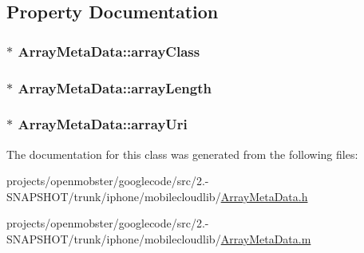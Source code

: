 \subsection{\-Property \-Documentation}
\hypertarget{interface_array_meta_data_adc0bd99d0f5b34b67b312779a298f294}{
\subsubsection[{array\-Class}]{ $\ast$ \-Array\-Meta\-Data\-::array\-Class}}
\label{interface_array_meta_data_adc0bd99d0f5b34b67b312779a298f294}
\hypertarget{interface_array_meta_data_a450df0dafccdb9905bc4164e91129026}{
\subsubsection[{array\-Length}]{ $\ast$ \-Array\-Meta\-Data\-::array\-Length}}
\label{interface_array_meta_data_a450df0dafccdb9905bc4164e91129026}
\hypertarget{interface_array_meta_data_a860a557b87e0c559db7fd7c840409cee}{
\subsubsection[{array\-Uri}]{ $\ast$ \-Array\-Meta\-Data\-::array\-Uri}}
\label{interface_array_meta_data_a860a557b87e0c559db7fd7c840409cee}


\-The documentation for this class was generated from the following files\-:\begin{DoxyCompactItemize}
\item 
projects/openmobster/googlecode/src/2.-\/\-S\-N\-A\-P\-S\-H\-O\-T/trunk/iphone/mobilecloudlib/\hyperlink{_array_meta_data_8h}{\-Array\-Meta\-Data.\-h}\item 
projects/openmobster/googlecode/src/2.-\/\-S\-N\-A\-P\-S\-H\-O\-T/trunk/iphone/mobilecloudlib/\hyperlink{_array_meta_data_8m}{\-Array\-Meta\-Data.\-m}\end{DoxyCompactItemize}
